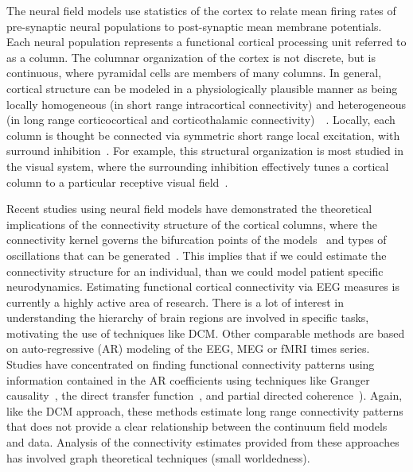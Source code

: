 \documentclass[onecolumn,draftcls]{IEEEtran}
\begin{document}
The neural field models use statistics of the cortex to relate mean firing rates of pre-synaptic neural populations to post-synaptic mean membrane potentials. Each neural population represents a functional cortical processing unit referred to as a column. The columnar organization of the cortex is not discrete, but is continuous, where pyramidal cells are members of many columns. In general, cortical structure can be modeled in a physiologically plausible manner as being locally homogeneous (in short range intracortical connectivity) and heterogeneous (in long range corticocortical and corticothalamic connectivity)~\cite{Jirsa2009}~\cite{Qubbaj2007}. Locally, each column is thought be connected via symmetric short range local excitation, with surround inhibition~\cite{Braitenberg1998}. For example, this structural organization is most studied in the visual system, where the surrounding inhibition effectively tunes a cortical column to a particular receptive visual field~\cite{Sullivan2006}.

Recent studies using neural field models have demonstrated the theoretical implications of the connectivity structure of the cortical columns, where the connectivity kernel governs the bifurcation points of the models~\cite{Hutt2005} and types of oscillations that can be generated~\cite{Schmidt2009}. This implies that if we could estimate the connectivity structure for an individual, than we could model patient specific neurodynamics. Estimating functional cortical connectivity via EEG measures is currently a highly active area of research. There is a lot of interest in understanding the hierarchy of brain regions are involved in specific tasks, motivating the use of techniques like DCM. Other comparable methods are based on auto-regressive (AR) modeling of the EEG, MEG or fMRI times series. Studies have concentrated on finding functional connectivity patterns using information contained in the AR coefficients using techniques like Granger causality~\cite{Hesse2003}, the direct transfer function~\cite{Kaminski1991}, and partial directed coherence~\cite{Sameshima1999}). Again, like the DCM approach, these methods estimate long range connectivity patterns that does not provide a clear relationship between the continuum field models and data. Analysis of the connectivity estimates provided from these approaches has involved graph theoretical techniques (small worldedness).
\end{document}
